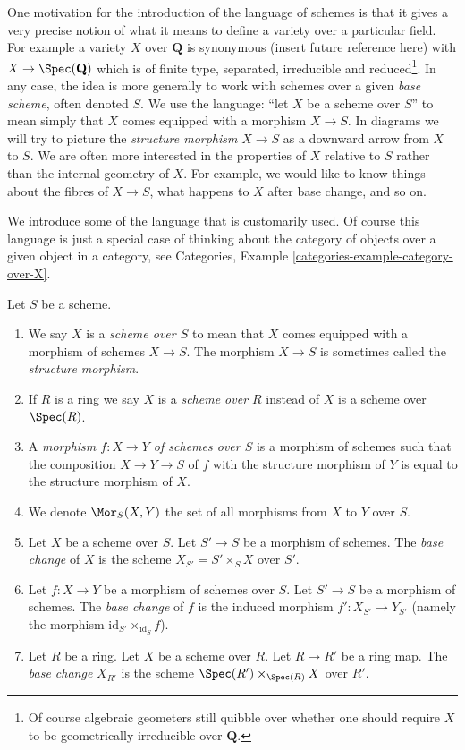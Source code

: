 \noindent
One motivation for the introduction of the language of schemes
is that it gives a very precise notion of what it means to
define a variety over a particular field. For example a variety
$X$ over $\mathbf{Q}$ is synonymous (insert future reference here)
with $X \to \Spec(\mathbf{Q})$ which is of finite type,
separated, irreducible and reduced\footnote{Of course algebraic
geometers still quibble over whether one should require $X$ to be
geometrically irreducible over $\mathbf{Q}$.}. In any case, the idea
is more generally to work with schemes over a given {\it base scheme},
often denoted $S$. We use the language: ``let $X$ be a scheme over $S$''
to mean simply that $X$ comes equipped with a morphism $X \to S$.
In diagrams we will try to picture the {\it structure morphism}
$X \to S$ as a downward arrow from $X$ to $S$.
We are often more interested in the properties of $X$ relative
to $S$ rather than the internal geometry of $X$.
For example, we would like to know things about the fibres of $X \to S$,
what happens to $X$ after base change, and so on.

\medskip\noindent
We introduce some of the language that is customarily used.
Of course this language is just a special case of thinking
about the category of objects over a given object in a category,
see Categories, Example \ref{categories-example-category-over-X}.

\begin{definition}
\label{definition-base-change}
Let $S$ be a scheme.
\begin{enumerate}
\item We say $X$ is a {\it scheme over $S$} to mean that $X$
comes equipped with a morphism of schemes $X \to S$.
The morphism $X \to S$ is sometimes called the
{\it structure morphism}.
\item If $R$ is a ring we say
$X$ is a {\it scheme over $R$} instead of
$X$ is a scheme over $\Spec(R)$.
\item A {\it morphism $f : X \to Y$ of schemes over $S$}
is a morphism of schemes such that the composition
$X \to Y \to S$ of $f$ with the structure morphism of $Y$ is
equal to the structure morphism of $X$.
\item We denote $\Mor_S(X, Y)$ the set of all morphisms
from $X$ to $Y$ over $S$.
\item Let $X$ be a scheme over $S$. Let $S' \to S$ be a
morphism of schemes. The {\it base change} of $X$
is the scheme $X_{S'} = S' \times_S X$ over $S'$.
\item Let $f : X \to Y$ be a morphism of schemes over $S$. Let $S' \to S$
be a morphism of schemes. The {\it base change} of $f$ is
the induced morphism $f' : X_{S'} \to Y_{S'}$ (namely the
morphism $\text{id}_{S'} \times_{\text{id}_S} f$).
\item Let $R$ be a ring. Let $X$ be a scheme over $R$.
Let $R \to R'$ be a ring map. The {\it base change} $X_{R'}$
is the scheme $\Spec(R') \times_{\Spec(R)} X$
over $R'$.
\end{enumerate}
\end{definition}

